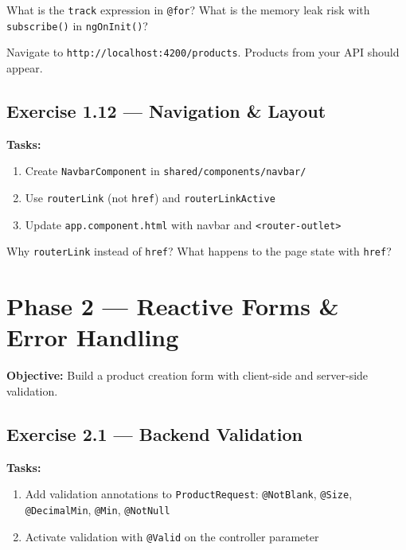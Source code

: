 \documentclass[12pt,a4paper]{report}
\begin{document}
\begin{thinkbox}
What is the \texttt{track} expression in \texttt{@for}? What is the memory leak risk with \texttt{subscribe()} in \texttt{ngOnInit()}?
\end{thinkbox}

\begin{checkpoint}
Navigate to \texttt{http://localhost:4200/products}. Products from your API should appear.
\end{checkpoint}

\section{Exercise 1.12 --- Navigation \& Layout}

\textbf{Tasks:}
\begin{enumerate}
    \item Create \texttt{NavbarComponent} in \texttt{shared/components/navbar/}
    \item Use \texttt{routerLink} (not \texttt{href}) and \texttt{routerLinkActive}
    \item Update \texttt{app.component.html} with navbar and \texttt{<router-outlet>}
\end{enumerate}

\begin{thinkbox}
Why \texttt{routerLink} instead of \texttt{href}? What happens to the page state with \texttt{href}?
\end{thinkbox}

\chapter{Phase 2 --- Reactive Forms \& Error Handling}

\textbf{Objective:} Build a product creation form with client-side and server-side validation.

\section{Exercise 2.1 --- Backend Validation}

\textbf{Tasks:}
\begin{enumerate}
    \item Add validation annotations to \texttt{ProductRequest}: \texttt{@NotBlank}, \texttt{@Size}, \texttt{@DecimalMin}, \texttt{@Min}, \texttt{@NotNull}
    \item Activate validation with \texttt{@Valid} on the controller parameter
\end{enumerate}
\end{document}
